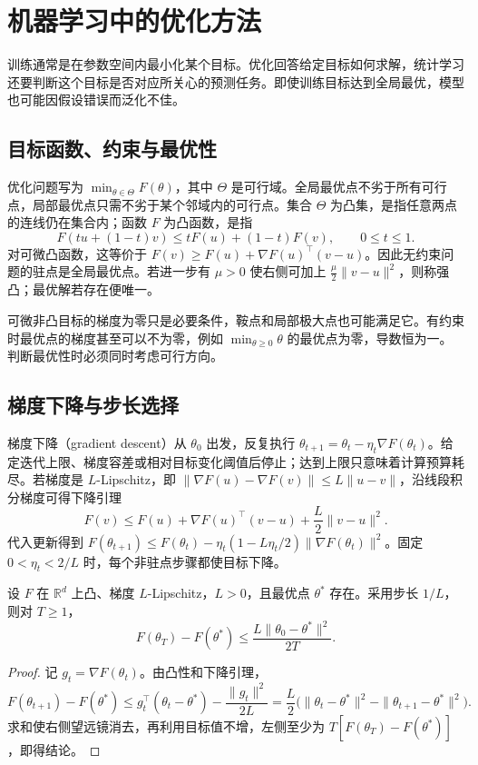 \setcounter{chapter}{3} %
\chapter{机器学习中的优化方法}
\label{chap:ml-optimization}

训练通常是在参数空间内最小化某个目标。优化回答给定目标如何求解，统计学习还要判断这个目标是否对应所关心的预测任务。即使训练目标达到全局最优，模型也可能因假设错误而泛化不佳。

\section{目标函数、约束与最优性}

优化问题写为 $\min_{\theta\in\Theta}F(\theta)$，其中 $\Theta$ 是可行域。全局最优点不劣于所有可行点，局部最优点只需不劣于某个邻域内的可行点。集合 $\Theta$ 为凸集，是指任意两点的连线仍在集合内；函数 $F$ 为凸函数，是指
\[
 F(tu+(1-t)v)\leq tF(u)+(1-t)F(v),\qquad 0\leq t\leq1.
\]
对可微凸函数，这等价于 $F(v)\geq F(u)+\nabla F(u)^\top(v-u)$。因此无约束问题的驻点是全局最优点。若进一步有 $\mu>0$ 使右侧可加上 $\frac\mu2\|v-u\|^2$，则称强凸；最优解若存在便唯一。

可微非凸目标的梯度为零只是必要条件，鞍点和局部极大点也可能满足它。有约束时最优点的梯度甚至可以不为零，例如 $\min_{\theta\geq0}\theta$ 的最优点为零，导数恒为一。判断最优性时必须同时考虑可行方向。

\section{梯度下降与步长选择}

梯度下降（gradient descent）从 $\theta_0$ 出发，反复执行 $\theta_{t+1}=\theta_t-\eta_t\nabla F(\theta_t)$。给定迭代上限、梯度容差或相对目标变化阈值后停止；达到上限只意味着计算预算耗尽。若梯度是 $L$-Lipschitz，即 $\|\nabla F(u)-\nabla F(v)\|\leq L\|u-v\|$，沿线段积分梯度可得下降引理
\[
 F(v)\leq F(u)+\nabla F(u)^\top(v-u)+\frac L2\|v-u\|^2.
\]
代入更新得到 $F(\theta_{t+1})\leq F(\theta_t)-\eta_t(1-L\eta_t/2)\|\nabla F(\theta_t)\|^2$。固定 $0<\eta_t<2/L$ 时，每个非驻点步骤都使目标下降。

\begin{proposition}[光滑凸目标的梯度下降界]
设 $F$ 在 $\mathbb R^d$ 上凸、梯度 $L$-Lipschitz，$L>0$，且最优点 $\theta^*$ 存在。采用步长 $1/L$，则对 $T\geq1$，
\[
 F(\theta_T)-F(\theta^*)\leq\frac{L\|\theta_0-\theta^*\|^2}{2T}.
\]
\end{proposition}
\begin{proof}
记 $g_t=\nabla F(\theta_t)$。由凸性和下降引理，
\[
 F(\theta_{t+1})-F(\theta^*)\leq
 g_t^\top(\theta_t-\theta^*)-\frac{\|g_t\|^2}{2L}
 =\frac L2\bigl(\|\theta_t-\theta^*\|^2-\|\theta_{t+1}-\theta^*\|^2\bigr).
\]
求和使右侧望远镜消去，再利用目标值不增，左侧至少为 $T[F(\theta_T)-F(\theta^*)]$，即得结论。
\end{proof}

